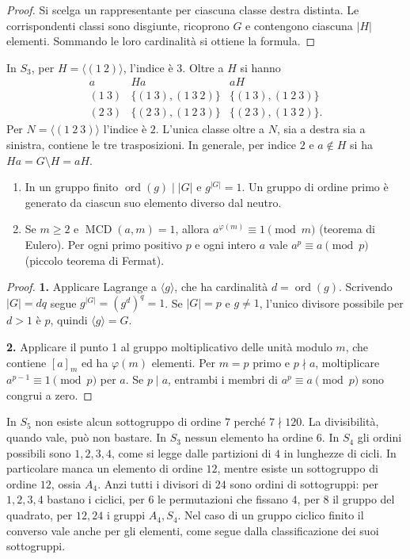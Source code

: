 \begin{proof}
Si scelga un rappresentante per ciascuna classe destra distinta. Le corrispondenti classi sono disgiunte, ricoprono $G$ e contengono ciascuna $|H|$ elementi. Sommando le loro cardinalità si ottiene la formula.
\end{proof}
\begin{esempio}
In $S_3$, per $H=\langle(1\ 2)\rangle$, l'indice è $3$. Oltre a $H$ si hanno
\[
\begin{array}{c|cc}
a&Ha&aH\\\hline
(1\ 3)&\{(1\ 3),(1\ 3\ 2)\}&\{(1\ 3),(1\ 2\ 3)\}\\
(2\ 3)&\{(2\ 3),(1\ 2\ 3)\}&\{(2\ 3),(1\ 3\ 2)\}.
\end{array}
\]
Per $N=\langle(1\ 2\ 3)\rangle$ l'indice è $2$. L'unica classe oltre a $N$, sia a destra sia a sinistra, contiene le tre trasposizioni. In generale, per indice $2$ e $a\notin H$ si ha $Ha=G\setminus H=aH$.
\end{esempio}
\begin{corollario}
\begin{enumerate}
\item In un gruppo finito $\operatorname{ord}(g)\mid |G|$ e $g^{|G|}=1$. Un gruppo di ordine primo è generato da ciascun suo elemento diverso dal neutro.
\item Se $m\ge2$ e $\operatorname{MCD}(a,m)=1$, allora $a^{\varphi(m)}\equiv1\pmod m$ (teorema di Eulero). Per ogni primo positivo $p$ e ogni intero $a$ vale $a^p\equiv a\pmod p$ (piccolo teorema di Fermat).
\end{enumerate}
\end{corollario}
\begin{proof}
\textbf{1.} Applicare Lagrange a $\langle g\rangle$, che ha cardinalità $d=\operatorname{ord}(g)$. Scrivendo $|G|=dq$ segue $g^{|G|}=(g^d)^q=1$. Se $|G|=p$ e $g\ne1$, l'unico divisore possibile per $d>1$ è $p$, quindi $\langle g\rangle=G$.

\textbf{2.} Applicare il punto 1 al gruppo moltiplicativo delle unità modulo $m$, che contiene $[a]_m$ ed ha $\varphi(m)$ elementi. Per $m=p$ primo e $p\nmid a$, moltiplicare $a^{p-1}\equiv1\pmod p$ per $a$. Se $p\mid a$, entrambi i membri di $a^p\equiv a\pmod p$ sono congrui a zero.
\end{proof}
\begin{esempio}
In $S_5$ non esiste alcun sottogruppo di ordine $7$ perché $7\nmid120$. La divisibilità, quando vale, può non bastare. In $S_3$ nessun elemento ha ordine $6$. In $S_4$ gli ordini possibili sono $1,2,3,4$, come si legge dalle partizioni di $4$ in lunghezze di cicli. In particolare manca un elemento di ordine $12$, mentre esiste un sottogruppo di ordine $12$, ossia $A_4$. Anzi tutti i divisori di $24$ sono ordini di sottogruppi: per $1,2,3,4$ bastano i ciclici, per $6$ le permutazioni che fissano $4$, per $8$ il gruppo del quadrato, per $12,24$ i gruppi $A_4,S_4$. Nel caso di un gruppo ciclico finito il converso vale anche per gli elementi, come segue dalla classificazione dei suoi sottogruppi.
\end{esempio}
